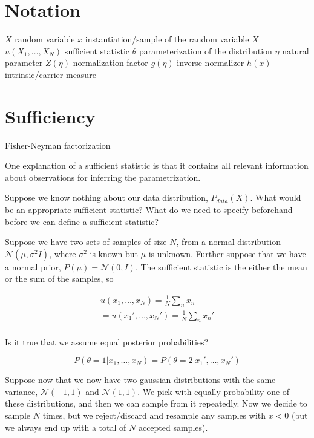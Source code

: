 \documentclass[a4paper]{article}
\begin{document}
\section{Notation}

$X$ random variable
$x$ instantiation/sample of the random variable $X$
$u(X_1, \ldots, X_N)$ sufficient statistic
$\theta$ parameterization of the distribution
$\eta$ natural parameter
$Z(\eta)$ normalization factor
$g(\eta)$ inverse normalizer
$h(x)$ intrinsic/carrier measure

\section{Sufficiency}

Fisher-Neyman factorization

One explanation of a sufficient statistic is that it contains all relevant information about observations for inferring the parametrization.

Suppose we know nothing about our data distribution, $P_{data}(X)$.  What would be an appropriate sufficient statistic?  
What do we need to specify beforehand before we can define a sufficient statistic?  

Suppose we have two sets of samples of size $N$, from a normal distribution $\mathcal{N}( \mu, \sigma^2 I )$, where $\sigma^2$ is known but $\mu$ is unknown.  
Further suppose that we have a normal prior, $P(\mu) = \mathcal{N}(0,I)$.  
The sufficient statistic is the either the mean or the sum of the samples, so 

\begin{equation}
  \begin{split}
    u(x_1,\ldots,x_N) = \frac{1}{N} \sum_n x_n \\
    = u(x_1',\ldots,x_N') = \frac{1}{N} \sum_n x_n' \\
  \end{split}
  \label{}
\end{equation}

Is it true that we assume equal posterior probabilities?

\begin{equation}
  P( \theta = 1 \vert x_1,\ldots,x_N ) = P( \theta = 2 \vert x_1', \ldots, x_N')
  \label{}
\end{equation}

Suppose now that we now have two gaussian distributions with the same variance, $\mathcal{N}(-1,1)$ and $\mathcal{N}(1,1)$.  We pick with equally probability one of these distributions, and then we can sample from it repeatedly.
Now we decide to sample $N$ times, but we reject/discard and resample any samples with $x<0$ (but we always end up with a total of $N$ accepted samples).
\end{document}
